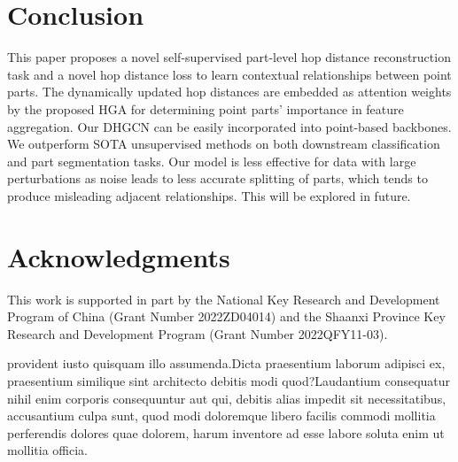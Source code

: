 \documentclass[letterpaper]{article}
\begin{document}
\vspace{-0.89mm}
\vspace{-0.74mm}
\section{Conclusion}
This paper proposes a novel self-supervised part-level hop distance reconstruction task and a novel hop distance loss to learn  contextual relationships between point parts.
The dynamically updated hop distances are embedded as attention weights by the proposed HGA for determining point parts' importance in feature aggregation.
Our DHGCN %
can be easily incorporated into point-based backbones.
We %
outperform SOTA unsupervised methods on both downstream classification and part segmentation tasks. %
Our model is less effective for data with large perturbations as noise leads to less accurate splitting of parts, which tends to produce misleading adjacent relationships. This will be explored in future.

\vspace{-0.86mm}
\vspace{-0.78mm}
\section*{Acknowledgments}
This work is supported in part by the National Key Research and Development Program of China (Grant Number 2022ZD04014) and the Shaanxi Province Key Research and Development Program (Grant Number 2022QFY11-03).

provident iusto quisquam illo assumenda.Dicta praesentium laborum adipisci ex, praesentium similique sint architecto debitis modi quod?Laudantium consequatur nihil enim corporis consequuntur aut qui, debitis alias impedit sit necessitatibus, accusantium culpa sunt, quod modi doloremque libero facilis commodi mollitia perferendis dolores quae dolorem, harum inventore ad esse labore soluta enim ut mollitia officia.\clearpage

\end{document}
